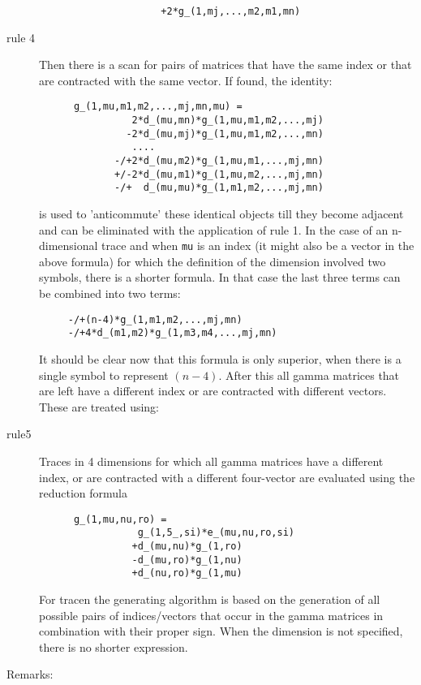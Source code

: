 \begin{description}
\begin{verbatim}
                     +2*g_(1,mj,...,m2,m1,mn)
\end{verbatim}
\item [rule 4]
  Then there is a scan for pairs of matrices that have the 
same index or that are contracted with the same vector. If found, the 
identity:
\begin{verbatim}
      g_(1,mu,m1,m2,...,mj,mn,mu) =
                2*d_(mu,mn)*g_(1,mu,m1,m2,...,mj)
               -2*d_(mu,mj)*g_(1,mu,m1,m2,...,mn)
                ....
             -/+2*d_(mu,m2)*g_(1,mu,m1,...,mj,mn)
             +/-2*d_(mu,m1)*g_(1,mu,m2,...,mj,mn)
             -/+  d_(mu,mu)*g_(1,m1,m2,...,mj,mn)
\end{verbatim}
\noindent is used to 'anticommute' these identical 
objects till they become adjacent and can be eliminated with the 
application of rule 1. In the case of an n-dimensional trace and when 
\verb:mu: is an index (it might also be a vector in the above formula) for 
which the definition of the dimension involved two symbols, there is a 
shorter formula. In that case the last three terms can be combined into two 
terms:
\begin{verbatim}
     -/+(n-4)*g_(1,m1,m2,...,mj,mn)
     -/+4*d_(m1,m2)*g_(1,m3,m4,...,mj,mn)
\end{verbatim}
\noindent It should be clear now that this formula is only superior, when 
there is a single symbol to represent $(n-4)$. After this all gamma 
matrices that are left have a different index or are contracted with 
different vectors. These are treated using:
\item [rule5]
  Traces in 4 dimensions for which all gamma matrices have 
a different index, or are contracted with a different four-vector are 
evaluated using the reduction formula
\begin{verbatim}
      g_(1,mu,nu,ro) =
                 g_(1,5_,si)*e_(mu,nu,ro,si)
                +d_(mu,nu)*g_(1,ro)
                -d_(mu,ro)*g_(1,nu)
                +d_(nu,ro)*g_(1,mu)
\end{verbatim}
For tracen the generating algorithm is based on the generation of all 
possible pairs of indices/vectors that occur in the gamma matrices in 
combination with their proper sign. When the dimension is not specified, 
there is no shorter expression.
\end{description}

\noindent Remarks:

